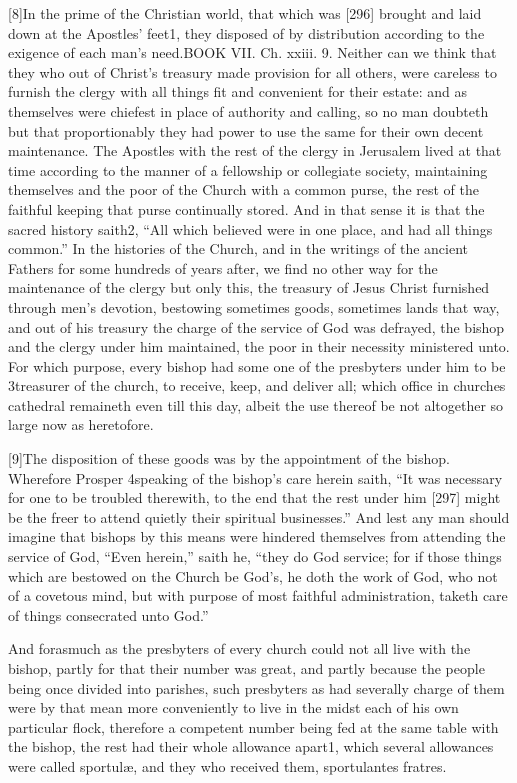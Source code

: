 [8]In the prime of the Christian world, that which was [296] brought and laid down at the Apostles’ feet1, they disposed of by distribution according to the exigence of each man’s need.BOOK VII. Ch. xxiii. 9. Neither can we think that they who out of Christ’s treasury made provision for all others, were careless to furnish the clergy with all things fit and convenient for their estate: and as themselves were chiefest in place of authority and calling, so no man doubteth but that proportionably they had power to use the same for their own decent maintenance. The Apostles with the rest of the clergy in Jerusalem lived at that time according to the manner of a fellowship or collegiate society, maintaining themselves and the poor of the Church with a common purse, the rest of the faithful keeping that purse continually stored. And in that sense it is that the sacred history saith2, “All which believed were in one place, and had all things common.” In the histories of the Church, and in the writings of the ancient Fathers for some hundreds of years after, we find no other way for the maintenance of the clergy but only this, the treasury of Jesus Christ furnished through men’s devotion, bestowing sometimes goods, sometimes lands that way, and out of his treasury the charge of the service of God was defrayed, the bishop and the clergy under him maintained, the poor in their necessity ministered unto. For which purpose, every bishop had some one of the presbyters under him to be 3treasurer of the church, to receive, keep, and deliver all; which office in churches cathedral remaineth even till this day, albeit the use thereof be not altogether so large now as heretofore.

[9]The disposition of these goods was by the appointment of the bishop. Wherefore Prosper 4speaking of the bishop’s care herein saith, “It was necessary for one to be troubled therewith, to the end that the rest under him [297] might be the freer to attend quietly their spiritual businesses.” And lest any man should imagine that bishops by this means were hindered themselves from attending the service of God, “Even herein,” saith he, “they do God service; for if those things which are bestowed on the Church be God’s, he doth the work of God, who not of a covetous mind, but with purpose of most faithful administration, taketh care of things consecrated unto God.”

And forasmuch as the presbyters of every church could not all live with the bishop, partly for that their number was great, and partly because the people being once divided into parishes, such presbyters as had severally charge of them were by that mean more conveniently to live in the midst each of his own particular flock, therefore a competent number being fed at the same table with the bishop, the rest had their whole allowance apart1, which several allowances were called sportulæ, and they who received them, sportulantes fratres.


